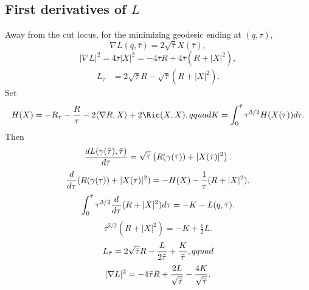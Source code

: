 \subsection{First derivatives of $L$}
Away from the cut locus, for the minimizing geodesic ending at $(q,\bar\tau)$,
\begin{equation}\label{grad1}\nabla L(q,\bar\tau)=2\sqrt{\bar\tau}X(\bar\tau),\end{equation}
\begin{equation}\label{gradsq}|\nabla L|^2=4\bar\tau|X|^2=-4\bar\tau R+4\bar\tau(R+|X|^2),\end{equation}
\begin{align}\label{timed}
L_{\bar\tau}&=2\sqrt{\bar\tau}R-\sqrt{\bar\tau}(R+|X|^2).
\end{align}
Set
\begin{equation}\label{Hexp}H(X)=-R_\tau-{R\over\tau}-2\langle\nabla R,X\rangle+2\Ric(X,X),qquad
K=\int_0^{\bar\tau}\tau^{3/2}H(X(\tau))d\tau.
\end{equation}
Then
\begin{equation}\label{grad2}
{dL(\gamma(\bar\tau),\bar\tau)\over d\bar\tau}
=\sqrt{\bar\tau}\left(R(\gamma(\bar\tau))+|X(\bar\tau)|^2\right).
\end{equation}
\begin{equation}\label{ddt}
{d\over d\tau}(R(\gamma(\tau))+|X(\tau)|^2)
=-H(X)-{1\over\tau}(R+|X|^2).
\end{equation}
\begin{equation}\label{parts}
\int_0^{\bar\tau}\tau^{3/2}{d\over d\tau}(R+|X|^2)d\tau=-K-L(q,\bar\tau).
\end{equation}
\begin{equation}\label{sub4}\bar\tau^{3/2}(R+|X|^2)=-K+\tfrac12L.\end{equation}
\begin{equation}\label{touse1}L_{\bar\tau}=2\sqrt{\bar\tau}R-{L\over2\bar\tau}+{K\over\bar\tau},qquad
\end{equation}
\begin{equation}\label{ttouse1}
|\nabla L|^2=-4\bar\tau R+{2L\over\sqrt{\bar\tau}}-{4K\over\sqrt{\bar\tau}}.
\end{equation}

